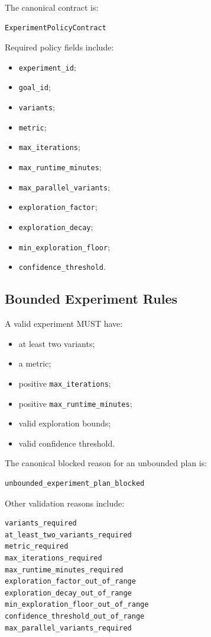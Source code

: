 The canonical contract is:

\begin{verbatim}
ExperimentPolicyContract
\end{verbatim}

Required policy fields include:

\begin{itemize}
  \item \texttt{experiment_id};
  \item \texttt{goal_id};
  \item \texttt{variants};
  \item \texttt{metric};
  \item \texttt{max_iterations};
  \item \texttt{max_runtime_minutes};
  \item \texttt{max_parallel_variants};
  \item \texttt{exploration_factor};
  \item \texttt{exploration_decay};
  \item \texttt{min_exploration_floor};
  \item \texttt{confidence_threshold}.
\end{itemize}

\subsection{Bounded Experiment Rules}

A valid experiment MUST have:

\begin{itemize}
  \item at least two variants;
  \item a metric;
  \item positive \texttt{max_iterations};
  \item positive \texttt{max_runtime_minutes};
  \item valid exploration bounds;
  \item valid confidence threshold.
\end{itemize}

The canonical blocked reason for an unbounded plan is:

\begin{verbatim}
unbounded_experiment_plan_blocked
\end{verbatim}

Other validation reasons include:

\begin{verbatim}
variants_required
at_least_two_variants_required
metric_required
max_iterations_required
max_runtime_minutes_required
exploration_factor_out_of_range
exploration_decay_out_of_range
min_exploration_floor_out_of_range
confidence_threshold_out_of_range
max_parallel_variants_required
\end{verbatim}

